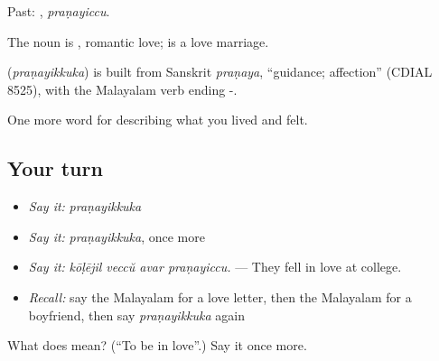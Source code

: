 Past: , \emph{praṇayiccu}.

The noun is , romantic love;  is a love marriage.

\begin{cousinweb}
\textbf{} (\emph{praṇayikkuka}) is built from Sanskrit \emph{praṇaya}, \textquotedblleft{}guidance; affection\textquotedblright{} (CDIAL 8525), with the Malayalam verb ending -.
\end{cousinweb}

\begin{grammarlens}[title={What you've built}]
One more word for describing what you lived and felt.
\end{grammarlens}

\subsection*{Your turn}
\begin{itemize}
\raggedright
  \item \emph{Say it:} \emph{praṇayikkuka}
  \item \emph{Say it:} \emph{praṇayikkuka}, once more
  \item \emph{Say it:} \emph{kōḷējil veccŭ avar praṇayiccu.} — They fell in love at college.
  \item \emph{Recall:} say the Malayalam for a love letter, then the Malayalam for a boyfriend, then say \emph{praṇayikkuka} again
\end{itemize}

\begin{tcolorbox}[breakable,colback=teal!4,colframe=teal!35!black,title={Before you move on}]
What does  mean? (\textquotedblleft{}To be in love\textquotedblright{}.) Say it once more.
\end{tcolorbox}
